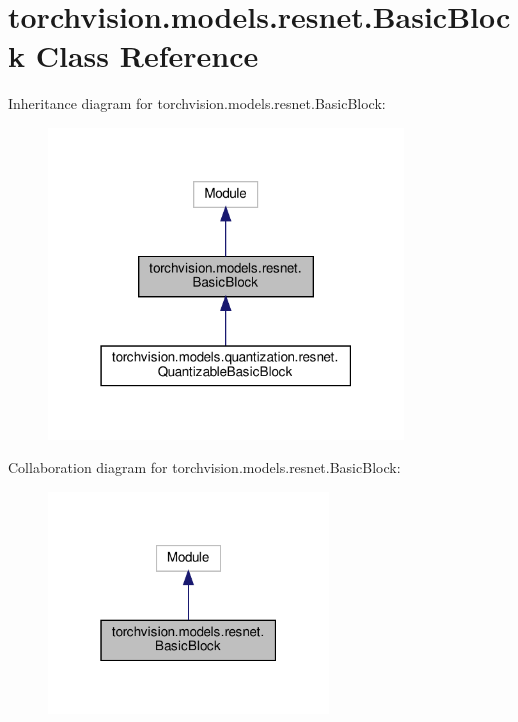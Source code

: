 \hypertarget{classtorchvision_1_1models_1_1resnet_1_1BasicBlock}{}\section{torchvision.\+models.\+resnet.\+Basic\+Block Class Reference}
\label{classtorchvision_1_1models_1_1resnet_1_1BasicBlock}


Inheritance diagram for torchvision.\+models.\+resnet.\+Basic\+Block\+:
\nopagebreak
\begin{figure}[H]
\begin{center}
\leavevmode
\includegraphics[width=267pt]{classtorchvision_1_1models_1_1resnet_1_1BasicBlock__inherit__graph}
\end{center}
\end{figure}


Collaboration diagram for torchvision.\+models.\+resnet.\+Basic\+Block\+:
\nopagebreak
\begin{figure}[H]
\begin{center}
\leavevmode
\includegraphics[width=211pt]{classtorchvision_1_1models_1_1resnet_1_1BasicBlock__coll__graph}
\end{center}
\end{figure}
